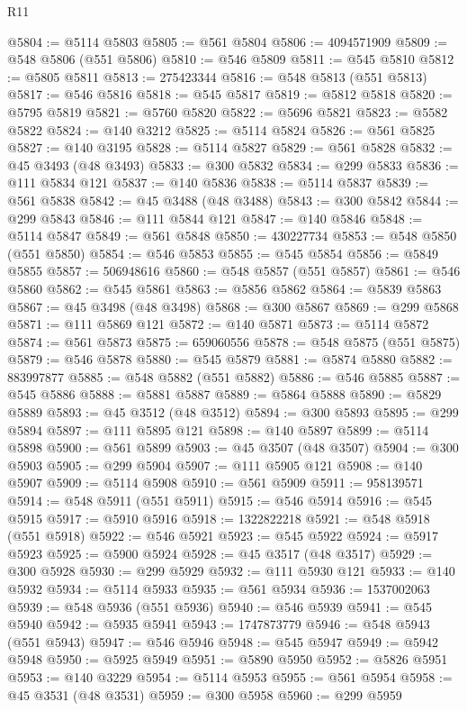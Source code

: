 \begin{lexlean}{R11}
\begin{coremodule}
@5804 := @5114 @5803
@5805 := @561 @5804
@5806 := 4094571909
@5809 := @548 @5806 (@551 @5806)
@5810 := @546 @5809
@5811 := @545 @5810
@5812 := @5805 @5811
@5813 := 275423344
@5816 := @548 @5813 (@551 @5813)
@5817 := @546 @5816
@5818 := @545 @5817
@5819 := @5812 @5818
@5820 := @5795 @5819
@5821 := @5760 @5820
@5822 := @5696 @5821
@5823 := @5582 @5822
@5824 := @140 @3212
@5825 := @5114 @5824
@5826 := @561 @5825
@5827 := @140 @3195
@5828 := @5114 @5827
@5829 := @561 @5828
@5832 := @45 @3493 (@48 @3493)
@5833 := @300 @5832
@5834 := @299 @5833
@5836 := @111 @5834 @121
@5837 := @140 @5836
@5838 := @5114 @5837
@5839 := @561 @5838
@5842 := @45 @3488 (@48 @3488)
@5843 := @300 @5842
@5844 := @299 @5843
@5846 := @111 @5844 @121
@5847 := @140 @5846
@5848 := @5114 @5847
@5849 := @561 @5848
@5850 := 430227734
@5853 := @548 @5850 (@551 @5850)
@5854 := @546 @5853
@5855 := @545 @5854
@5856 := @5849 @5855
@5857 := 506948616
@5860 := @548 @5857 (@551 @5857)
@5861 := @546 @5860
@5862 := @545 @5861
@5863 := @5856 @5862
@5864 := @5839 @5863
@5867 := @45 @3498 (@48 @3498)
@5868 := @300 @5867
@5869 := @299 @5868
@5871 := @111 @5869 @121
@5872 := @140 @5871
@5873 := @5114 @5872
@5874 := @561 @5873
@5875 := 659060556
@5878 := @548 @5875 (@551 @5875)
@5879 := @546 @5878
@5880 := @545 @5879
@5881 := @5874 @5880
@5882 := 883997877
@5885 := @548 @5882 (@551 @5882)
@5886 := @546 @5885
@5887 := @545 @5886
@5888 := @5881 @5887
@5889 := @5864 @5888
@5890 := @5829 @5889
@5893 := @45 @3512 (@48 @3512)
@5894 := @300 @5893
@5895 := @299 @5894
@5897 := @111 @5895 @121
@5898 := @140 @5897
@5899 := @5114 @5898
@5900 := @561 @5899
@5903 := @45 @3507 (@48 @3507)
@5904 := @300 @5903
@5905 := @299 @5904
@5907 := @111 @5905 @121
@5908 := @140 @5907
@5909 := @5114 @5908
@5910 := @561 @5909
@5911 := 958139571
@5914 := @548 @5911 (@551 @5911)
@5915 := @546 @5914
@5916 := @545 @5915
@5917 := @5910 @5916
@5918 := 1322822218
@5921 := @548 @5918 (@551 @5918)
@5922 := @546 @5921
@5923 := @545 @5922
@5924 := @5917 @5923
@5925 := @5900 @5924
@5928 := @45 @3517 (@48 @3517)
@5929 := @300 @5928
@5930 := @299 @5929
@5932 := @111 @5930 @121
@5933 := @140 @5932
@5934 := @5114 @5933
@5935 := @561 @5934
@5936 := 1537002063
@5939 := @548 @5936 (@551 @5936)
@5940 := @546 @5939
@5941 := @545 @5940
@5942 := @5935 @5941
@5943 := 1747873779
@5946 := @548 @5943 (@551 @5943)
@5947 := @546 @5946
@5948 := @545 @5947
@5949 := @5942 @5948
@5950 := @5925 @5949
@5951 := @5890 @5950
@5952 := @5826 @5951
@5953 := @140 @3229
@5954 := @5114 @5953
@5955 := @561 @5954
@5958 := @45 @3531 (@48 @3531)
@5959 := @300 @5958
@5960 := @299 @5959

\end{coremodule}
\end{lexlean}
